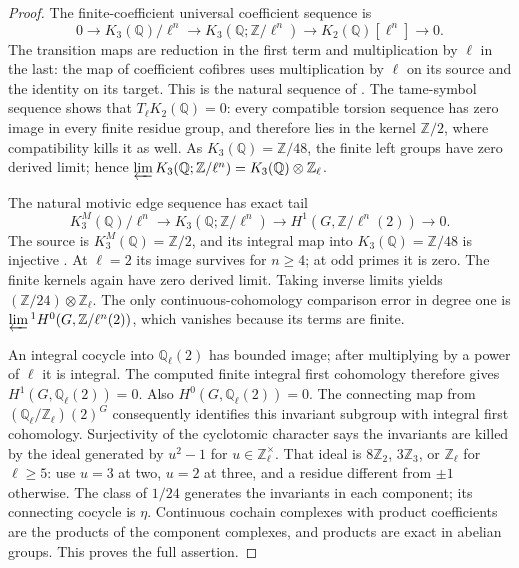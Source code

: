 \begin{proof}
The finite-coefficient universal coefficient sequence is
\[
 0\to K_3(\mathbb Q)/\ell^n\to
 K_3(\mathbb Q;\mathbb Z/\ell^n)\to K_2(\mathbb Q)[\ell^n]\to0.
\]
The transition maps are reduction in the first term and multiplication
by $\ell$ in the last: the map of coefficient cofibres uses
multiplication by $\ell$ on its source and the identity on its
target. This is the natural sequence of
\cite[IV.2.5]{CohWeibelKbook}. The tame-symbol sequence shows that
$T_\ell K_2(\mathbb Q)=0$: every compatible torsion sequence has
zero image in every finite residue group, and therefore lies in the
kernel $\mathbb Z/2$, where compatibility kills it as well.
As $K_3(\mathbb Q)=\mathbb Z/48$, the finite left groups have
zero derived limit; hence
$\varprojlim K_3(\mathbb Q;\mathbb Z/\ell^n)=
 K_3(\mathbb Q)\otimes\mathbb Z_\ell$.

The natural motivic edge sequence has exact tail
\[
 K_3^M(\mathbb Q)/\ell^n\longrightarrow
 K_3(\mathbb Q;\mathbb Z/\ell^n)\longrightarrow
 H^1(G,\mathbb Z/\ell^n(2))\longrightarrow0.
\]
The source is $K_3^M(\mathbb Q)=\mathbb Z/2$, and its integral
map into $K_3(\mathbb Q)=\mathbb Z/48$ is injective
\cite[VI.4.3.1--4.3.2; VI.5.2.1]{CohWeibelKbook}.
At $\ell=2$ its image survives for $n\geq4$; at odd primes it is
zero. The finite kernels again have zero derived limit. Taking inverse
limits yields $(\mathbb Z/24)\otimes\mathbb Z_\ell$. The only
continuous-cohomology comparison error in degree one is
$\varprojlim{}^1H^0(G,\mathbb Z/\ell^n(2))$, which vanishes
because its terms are finite.

An integral cocycle into $\mathbb Q_\ell(2)$ has bounded image;
after multiplying by a power of $\ell$ it is integral. The computed
finite integral first cohomology therefore gives
$H^1(G,\mathbb Q_\ell(2))=0$. Also
$H^0(G,\mathbb Q_\ell(2))=0$. The connecting map from
$(\mathbb Q_\ell/\mathbb Z_\ell)(2)^G$ consequently identifies
this invariant subgroup with integral first cohomology. Surjectivity
of the cyclotomic character says the invariants are killed by the
ideal generated by $u^2-1$ for $u\in\mathbb Z_\ell^\times$.
That ideal is $8\mathbb Z_2$, $3\mathbb Z_3$, or
$\mathbb Z_\ell$ for $\ell\geq5$: use $u=3$ at two, $u=2$
at three, and a residue different from $\pm1$ otherwise. The class
of $1/24$ generates the invariants in each component; its connecting
cocycle is $\eta$. Continuous cochain complexes with product
coefficients are the products of the component complexes, and products
are exact in abelian groups. This proves the full assertion.
\end{proof}

